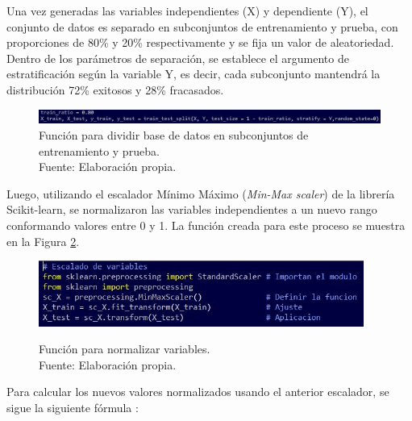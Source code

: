 Una vez generadas las variables independientes (X) y dependiente (Y), el conjunto de datos es separado en subconjuntos de entrenamiento y prueba, con proporciones de 80\% y 20\% respectivamente \citep{pr_yuan2016textanalytics,pr_yu2018deeplearning,pr_chen2019keywords_crowdfunding,pr_mitra2014phrases,pr_sawhney2016usingLT} y se fija un valor de aleatoriedad. Dentro de los parámetros de separación, se establece el argumento de estratificación según la variable Y, es decir, cada subconjunto mantendrá la distribución 72\% exitosos y 28\% fracasados.

\begin{figure}[!ht]
	\begin{center}
		\includegraphics[width=1.00\textwidth]{4/figures/train_test_split.jpg}
		\caption[Función para dividir base de datos en subconjuntos de entrenamiento y prueba]{Función para dividir base de datos en subconjuntos de entrenamiento y prueba.\\
			Fuente: Elaboración propia.}
		\label{4:fig28}
	\end{center}
\end{figure}

Luego, utilizando el escalador Mínimo Máximo (\textit{Min-Max scaler}) de la librería Scikit-learn, se normalizaron las variables independientes a un nuevo rango conformando valores entre 0 y 1. La función creada para este proceso se muestra en la Figura \ref{4:fig29}.

\begin{figure}[!ht]
	\begin{center}
		\includegraphics[width=0.95\textwidth]{4/figures/metadata_scaler_function.jpg}
		\caption[Función para normalizar variables]{Función para normalizar variables.\\
			Fuente: Elaboración propia.}
		\vspace{-0.5cm}
		\label{4:fig29}
	\end{center}
\end{figure}

Para calcular los nuevos valores normalizados usando el anterior escalador, se sigue la siguiente fórmula \citep{tec_minmaxscaler,tec_scikitlearn,tec_datascaling}:

